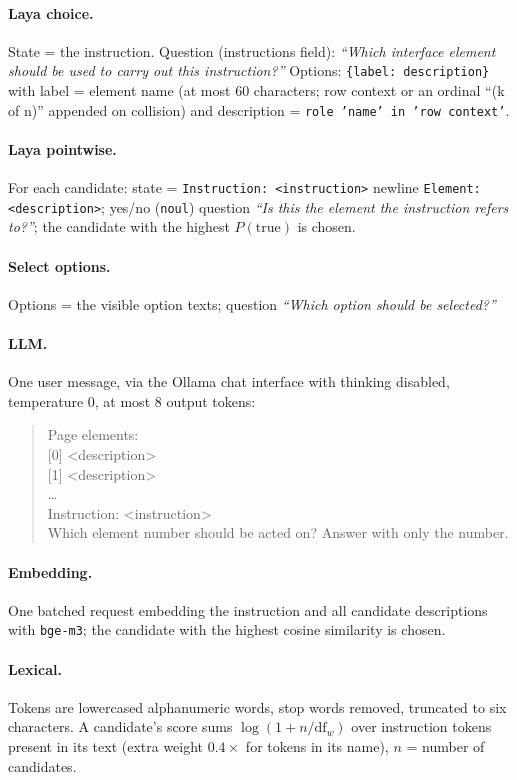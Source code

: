 \documentclass[11pt,a4paper]{article}
\begin{document}
\paragraph{Laya choice.} State = the instruction. Question (instructions field): \emph{``Which interface element should be used to carry out this instruction?''} Options: \texttt{\{label: description\}} with label = element name (at most 60 characters; row context or an ordinal ``(k of n)'' appended on collision) and description = \texttt{role 'name' in 'row context'}.
\paragraph{Laya pointwise.} For each candidate: state = \texttt{Instruction: <instruction>} newline \texttt{Element: <description>}; yes/no (\texttt{noul}) question \emph{``Is this the element the instruction refers to?''}; the candidate with the highest $P(\text{true})$ is chosen.
\paragraph{Select options.} Options = the visible option texts; question \emph{``Which option should be selected?''}
\paragraph{LLM.} One user message, via the Ollama chat interface with thinking disabled, temperature 0, at most 8 output tokens:
\begin{quote}\small\ttfamily
Page elements:\\ {[0]} <description>\\ {[1]} <description>\\ \ldots\\[2pt] Instruction: <instruction>\\ Which element number should be acted on? Answer with only the number.
\end{quote}
\paragraph{Embedding.} One batched request embedding the instruction and all candidate descriptions with \texttt{bge-m3}; the candidate with the highest cosine similarity is chosen.
\paragraph{Lexical.} Tokens are lowercased alphanumeric words, stop words removed, truncated to six characters. A candidate's score sums $\log(1+n/\mathrm{df}_w)$ over instruction tokens present in its text (extra weight $0.4\times$ for tokens in its name), $n$ = number of candidates.
\end{document}
